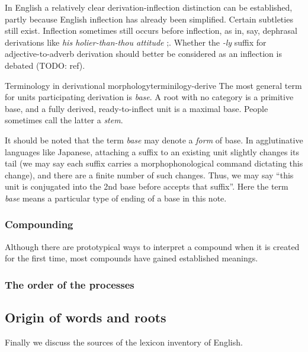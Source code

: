 \documentclass[UTF8, a4paper, oneside, scheme=plain]{ctexrep}
\newcommand*{\citepage}[1]{pp.~{#1}}
\newcommand*{\term}[1]{\emph{#1}}
\newcommand{\corpus}[1]{\emph{#1}}
\begin{document}
In English a relatively clear derivation-inflection distinction can be established,
partly because English inflection has already been simplified.
Certain subtleties still exist.
Inflection sometimes still occurs before inflection,
as in, say, dephrasal derivations like \corpus{his holier-than-thou attitude} \citep[\citepage{1646}]{cgel};.
Whether the \corpus{-ly} suffix for adjective-to-adverb derivation 
should better be considered as an inflection is debated (TODO: ref).

\begin{theorybox}{Terminology in derivational morphology}{terminilogy-derive}
    The most general term for units participating derivation is \term{base}.
    A root with no category is a primitive base,
    and a fully derived, ready-to-inflect unit is a maximal base.
    People sometimes call the latter a \term{stem}.

    It should be noted that the term \term{base} may denote a \emph{form} of base.
    In agglutinative languages like Japanese,
    attaching a suffix to an existing unit slightly changes its tail
    (we may say each suffix carries a morphophonological command 
    dictating this change),
    and there are a finite number of such changes.
    Thus, we may say ``this unit is conjugated into the 2nd base before accepts that suffix''.
    Here the term \term{base} means a particular type of ending 
    of a base in this note.
\end{theorybox}

\subsubsection{Compounding}\label{sec:pos.overview.derivation.compound}

Although there are prototypical ways to interpret a compound
when it is created for the first time,
most compounds have gained established meanings.

\subsubsection{The order of the processes}



\subsection{Origin of words and roots}

Finally we discuss the sources of the lexicon inventory of English.
\end{document}
